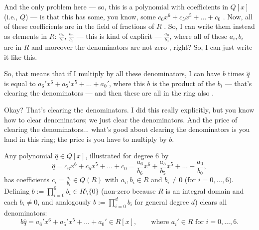 \begin{proofWrapper}
\begin{speech}[00:23:05 - 00:25:01]
And the only problem here --- so, this is a polynomial with coefficients in $Q[x]$ (i.e., $Q$) --- is that this has some, you know, some $c_6 x^6 + c_5 x^5 + \dots + c_0$ . Now, all of these coefficients are in the field of fractions of $R$ . So, I can write them instead as elements in $R$: $\frac{a_6}{b_6}$, $\frac{a_5}{b_5}$ --- this is kind of explicit --- $\frac{a_0}{b_0}$, where all of these $a_i, b_i$ are in $R$ and moreover the denominators are not zero , right? So, I can just write it like this.

So, that means that if I multiply by all these denominators, I can have $b$ times $\hat{q}$ is equal to $a_6' x^6 + a_5' x^5 + \dots + a_0'$, where this $b$ is the product of the $b_i$  --- that's clearing the denominators --- and then these are all in the ring also .

Okay? That's clearing the denominators. I did this really explicitly, but you know how to clear denominators; we just clear the denominators. And the price of clearing the denominators... what's good about clearing the denominators is you land in this ring; the price is you have to multiply by $b$.
\end{speech}

\begin{content}
Any polynomial $\hat{q} \in Q[x]$, illustrated for degree $6$ by
\[
\hat{q} = c_6 x^6 + c_5 x^5 + \dots + c_0 = \frac{a_6}{b_6} x^6 + \frac{a_5}{b_5} x^5 + \dots + \frac{a_0}{b_0},
\]
has coefficients $c_i = \frac{a_i}{b_i} \in Q(R)$ with $a_i, b_i \in R$ and $b_i \neq 0$ (for $i = 0, \dots, 6$). Defining $b := \prod_{i=0}^{6} b_i \in R \setminus \{0\}$ (non-zero because $R$ is an integral domain and each $b_i \neq 0$, and analogously $b := \prod_{i=0}^{d} b_i$ for general degree $d$) clears all denominators:
\[
b \hat{q} = a_6' x^6 + a_5' x^5 + \dots + a_0' \in R[x], \qquad \text{where } a_i' \in R \text{ for } i = 0, \dots, 6.
\]
\end{content}

\begin{hidden}
\end{hidden}


\end{proofWrapper}

